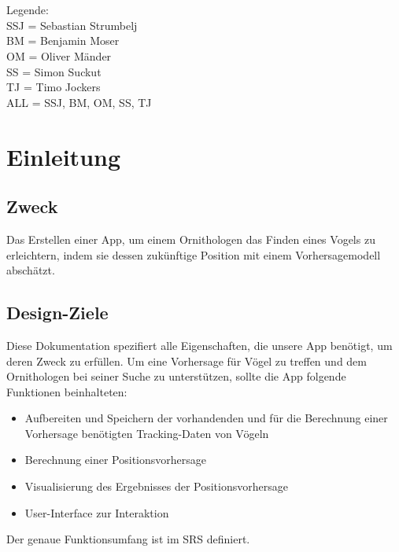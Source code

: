 \documentclass[12pt]{article} %
\begin{document}
{\small

\noindent
\\\\Legende: \\
SSJ = Sebastian Strumbelj \\
BM = Benjamin Moser \\
OM = Oliver Mänder \\
SS = Simon Suckut \\
TJ = Timo Jockers \\
ALL = SSJ, BM, OM, SS, TJ \\
}



\section{Einleitung} %


\subsection{Zweck}
Das Erstellen einer App, um einem Ornithologen das Finden eines Vogels zu erleichtern, indem sie dessen zukünftige Position mit einem Vorhersagemodell abschätzt. 


\subsection{Design-Ziele}

Diese Dokumentation spezifiert alle Eigenschaften, die unsere App benötigt, um deren Zweck zu erfüllen. Um eine Vorhersage für Vögel zu treffen und dem Ornithologen bei seiner Suche zu unterstützen, sollte die App folgende Funktionen beinhalteten: 
\begin{itemize}
	\item Aufbereiten und Speichern der vorhandenden und für die Berechnung einer Vorhersage benötigten Tracking-Daten von Vögeln
	\item Berechnung einer Positionsvorhersage
	\item Visualisierung des Ergebnisses der Positionsvorhersage
	\item User-Interface zur Interaktion 
\end{itemize}
Der genaue Funktionsumfang ist im SRS definiert.
\end{document}
